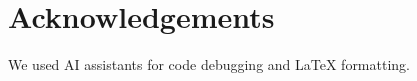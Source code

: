 \documentclass[11pt]{article}
\begin{document}


\section*{Acknowledgements}
We used AI assistants for code debugging and \LaTeX{} formatting.

\clearpage
\newpage


\clearpage
\newpage

\appendix




%
%
\end{document}
